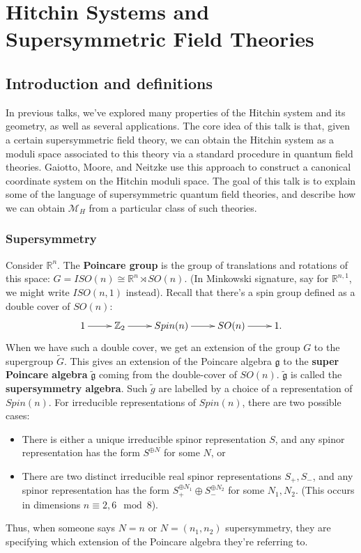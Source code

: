 \chapter{Hitchin Systems and Supersymmetric Field Theories}

\section{Introduction and definitions}

In previous talks, we've explored many properties of the Hitchin system
and its geometry, as well as several applications. The core idea of
this talk is that, given a certain supersymmetric field theory, we
can obtain the Hitchin system as a moduli space associated to this
theory via a standard procedure in quantum field theories. Gaiotto,
Moore, and Neitzke \cite{GMN} use this approach to construct a canonical
coordinate system on the Hitchin moduli space. The goal of this talk
is to explain some of the language of supersymmetric quantum field
theories, and describe how we can obtain $\mathcal{M}_{H}$ from a
particular class of such theories.


\subsection{Supersymmetry}

Consider $\mathbb{R}^{n}$. The \textbf{Poincare group} is the group
of translations and rotations of this space: $G=ISO(n)\cong\mathbb{R}^{n}\rtimes SO(n)$.
(In Minkowski signature, say for $\mathbb{R}^{n,1}$, we might write
$ISO(n,1)$ instead). Recall that there's a spin group defined as
a double cover of $SO(n)$:
\[
\xymatrix{1\ar[r] & \mathbb{Z}_{2}\ar[r] & Spin(n)\ar[r] & SO(n)\ar[r] & 1.}
\]
When we have such a double cover, we get an extension of the group
$G$ to the supergroup $\tilde{G}$. This gives an extension of the
Poincare algebra $\mathfrak{g}$ to the \textbf{super Poincare algebra}
$\tilde{\mathfrak{g}}$ coming from the double-cover of $SO(n)$.
$\tilde{\mathfrak{g}}$ is called the \textbf{supersymmetry algebra}.
Such $\tilde{g}$ are labelled by a choice of a representation of
$Spin(n)$. For irreducible representations of $Spin(n)$, there are
two possible cases:
\begin{itemize}
\item There is either a unique irreducible spinor representation $S$, and
any spinor representation has the form $S^{\oplus N}$ for some $N$,
or
\item There are two distinct irreducible real spinor representations $S_{+},S_{-}$,
and any spinor representation has the form $S_{+}^{\oplus N_{1}}\oplus S_{-}^{\oplus N_{2}}$
for some $N_{1},N_{2}$. (This occurs in dimensions $n\equiv2,6\mod8$).
\end{itemize}
Thus, when someone says $N=n$ or $N=\left(n_{1},n_{2}\right)$ supersymmetry,
they are specifying which extension of the Poincare algebra they're
referring to.

